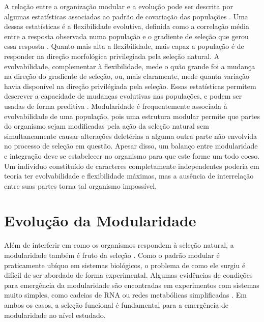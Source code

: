A relação entre a organização modular e a evolução pode ser descrita por
algumas estatísticas associadas ao padrão de covariação das populações
\citep{Hansen2008}. 
Uma dessas estatísticas é a flexibilidade evolutiva, definida como a
correlação média entre a resposta observada numa população e o gradiente
de seleção que gerou essa resposta \citep{Marroig2009}. 
Quanto mais alta a flexibilidade, mais capaz a população é de responder
na direção morfológica privilegiada pela seleção natural. 
A evolvabilidade, complementar à flexibilidade, mede o quão grande foi a
mudança na direção do gradiente de seleção, ou, mais claramente, mede
quanta variação havia disponível na direção privilégiada pela seleção. 
Essas estatísticas permitem descrever a capacidade de mudanças evolutivas
nas populações, e podem ser usadas de forma preditiva
\citep[veja, por exemplo,][]{Marroig2010}. 
Modularidade é frequentemente associada à evolvabilidade de uma
população, pois uma estrutura modular permite que partes do organismo sejam
modificadas pela ação da seleção natural sem simultaneamente causar
alterações deletérias a alguma outra parte não envolvida no processo de
seleção em questão. 
Apesar disso, um balanço entre modularidade e integração deve se
estabelecer no organismo para que este forme um todo coeso. 
Um indivíduo constituído de caracteres completamente independentes poderia
em teoria ter evolvabilidade e flexibilidade máximas, mas a ausência de
interrelação entre suas partes torna tal organismo impossível. 

\section{Evolução da Modularidade}\label{intro:evolucao}

Além de interferir em como os organismos respondem à seleção natural, a
modularidade também é fruto da seleção \citep{Wagner1996, Wagner2007}. 
Como o padrão modular é praticamente ubíquo em sistemas biológicos, o
problema de como ele surgiu é difícil de ser abordado de forma
experimental. 
Algumas evidências de condições para emergência da modularidade são
encontradas em experimentos com sistemas muito simples, como cadeias de
RNA \citep{Ancel2000} ou redes metabólicas simplificadas
\citep{Espinosa-Soto2010}. 
Em ambos os casos, a seleção funcional é fundamental para a emergência
de modularidade no nível estudado.

